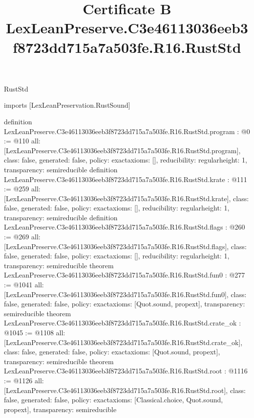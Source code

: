 \begin{lexlean}{RustStd}
\title{Certificate B LexLeanPreserve.C3e46113036eeb3f8723dd715a7a503fe.R16.RustStd}
\begin{coremodule}
imports [LexLeanPreservation.RustSound]

definition LexLeanPreserve.C3e46113036eeb3f8723dd715a7a503fe.R16.RustStd.program : @0 := @110 {
  all: [LexLeanPreserve.C3e46113036eeb3f8723dd715a7a503fe.R16.RustStd.program],
  class: false,
  generated: false,
  policy: exact{axioms: []},
  reducibility: regular{height: 1},
  transparency: semireducible
}
definition LexLeanPreserve.C3e46113036eeb3f8723dd715a7a503fe.R16.RustStd.krate : @111 := @259 {
  all: [LexLeanPreserve.C3e46113036eeb3f8723dd715a7a503fe.R16.RustStd.krate],
  class: false,
  generated: false,
  policy: exact{axioms: []},
  reducibility: regular{height: 1},
  transparency: semireducible
}
definition LexLeanPreserve.C3e46113036eeb3f8723dd715a7a503fe.R16.RustStd.flags : @260 := @269 {
  all: [LexLeanPreserve.C3e46113036eeb3f8723dd715a7a503fe.R16.RustStd.flags],
  class: false,
  generated: false,
  policy: exact{axioms: []},
  reducibility: regular{height: 1},
  transparency: semireducible
}
theorem LexLeanPreserve.C3e46113036eeb3f8723dd715a7a503fe.R16.RustStd.fun0 : @277 := @1041 {
  all: [LexLeanPreserve.C3e46113036eeb3f8723dd715a7a503fe.R16.RustStd.fun0],
  class: false,
  generated: false,
  policy: exact{axioms: [Quot.sound, propext]},
  transparency: semireducible
}
theorem LexLeanPreserve.C3e46113036eeb3f8723dd715a7a503fe.R16.RustStd.crate_ok : @1045 := @1108 {
  all: [LexLeanPreserve.C3e46113036eeb3f8723dd715a7a503fe.R16.RustStd.crate_ok],
  class: false,
  generated: false,
  policy: exact{axioms: [Quot.sound, propext]},
  transparency: semireducible
}
theorem LexLeanPreserve.C3e46113036eeb3f8723dd715a7a503fe.R16.RustStd.root : @1116 := @1126 {
  all: [LexLeanPreserve.C3e46113036eeb3f8723dd715a7a503fe.R16.RustStd.root],
  class: false,
  generated: false,
  policy: exact{axioms: [Classical.choice, Quot.sound, propext]},
  transparency: semireducible
}


\end{coremodule}
\end{lexlean}
